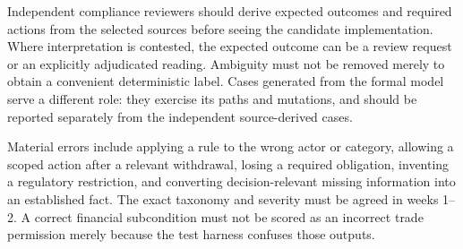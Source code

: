 Independent compliance reviewers should derive expected outcomes and required
actions from the selected sources before seeing the candidate implementation.
Where interpretation is contested, the expected outcome can be a review request
or an explicitly adjudicated reading. Ambiguity must not be removed merely to
obtain a convenient deterministic label. Cases generated from the formal model
serve a different role: they exercise its paths and mutations, and should be
reported separately from the independent source-derived cases.

Material errors include applying a rule to the wrong actor or category, allowing
a scoped action after a relevant withdrawal, losing a required obligation,
inventing a regulatory restriction, and converting decision-relevant missing
information into an established fact. The exact taxonomy and severity must be
agreed in weeks 1--2. A correct financial subcondition must not be scored as an
incorrect trade permission merely because the test harness confuses those outputs.


